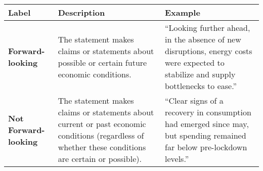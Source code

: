 \begin{table*}
    \caption{}
    \vspace{1em}
    \begin{tabular}{p{}p{}p{}}
    \toprule
    \textbf{Label} & \textbf{Description} & \textbf{Example}\\
    \midrule
    \textbf{Forward-looking} & The statement makes claims or statements about possible or certain future economic conditions. & ``Looking further ahead, in the absence of new disruptions, energy costs were expected to stabilize and supply bottlenecks to ease.'' \\
    \midrule
    \textbf{Not Forward-looking} & The statement makes claims or statements about current or past economic conditions (regardless of whether these conditions are certain or possible). & ``Clear signs of a recovery in consumption had emerged since may, but spending remained far below pre-lockdown levels.'' \\
    \bottomrule
    \end{tabular}
    \label{tb:ecb_forward_looking_guide}
    \end{table*}